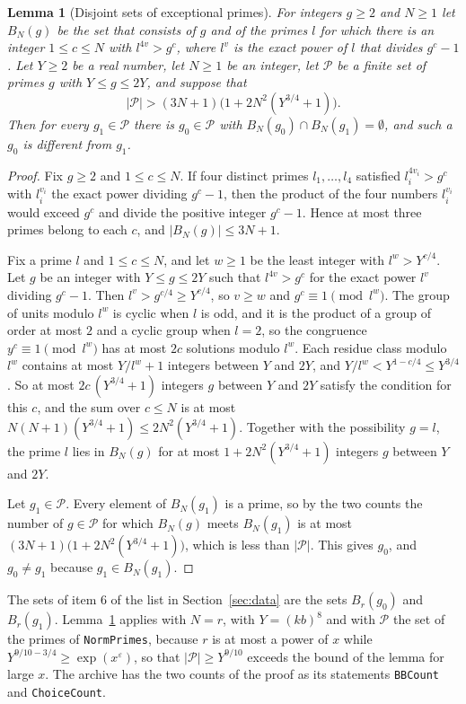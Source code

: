 \documentclass[11pt,letterpaper]{article}
\newtheorem{lemma}[theorem]{Lemma}
\numberwithin{equation}{section}
\begin{document}
\begin{lemma}[Disjoint sets of exceptional primes]\label{disjoint}
For integers $g\ge2$ and $N\ge1$ let $B_N(g)$ be the set that consists of $g$ and of the primes $l$ for which there is an integer $1\le c\le N$ with $l^{4v}>g^{c}$, where $l^{v}$ is the exact power of $l$ that divides $g^{c}-1$. Let $Y\ge2$ be a real number, let $N\ge1$ be an integer, let $\mathcal P$ be a finite set of primes $g$ with $Y\le g\le2Y$, and suppose that
\[
|\mathcal P|>(3N+1)\big(1+2N^2(Y^{3/4}+1)\big).
\]
Then for every $g_1\in\mathcal P$ there is $g_0\in\mathcal P$ with $B_N(g_0)\cap B_N(g_1)=\emptyset$, and such a $g_0$ is different from $g_1$.
\end{lemma}
\begin{proof}
Fix $g\ge2$ and $1\le c\le N$. If four distinct primes $l_1,\dots,l_4$ satisfied $l_i^{4v_i}>g^{c}$ with $l_i^{v_i}$ the exact power dividing $g^{c}-1$, then the product of the four numbers $l_i^{v_i}$ would exceed $g^{c}$ and divide the positive integer $g^{c}-1$. Hence at most three primes belong to each $c$, and $|B_N(g)|\le3N+1$.

Fix a prime $l$ and $1\le c\le N$, and let $w\ge1$ be the least integer with $l^{w}>Y^{c/4}$. Let $g$ be an integer with $Y\le g\le2Y$ such that $l^{4v}>g^{c}$ for the exact power $l^{v}$ dividing $g^{c}-1$. Then $l^{v}>g^{c/4}\ge Y^{c/4}$, so $v\ge w$ and $g^{c}\equiv1\pmod{l^{w}}$. The group of units modulo $l^{w}$ is cyclic when $l$ is odd, and it is the product of a group of order at most $2$ and a cyclic group when $l=2$, so the congruence $y^{c}\equiv1\pmod{l^{w}}$ has at most $2c$ solutions modulo $l^{w}$. Each residue class modulo $l^{w}$ contains at most $Y/l^{w}+1$ integers between $Y$ and $2Y$, and $Y/l^{w}<Y^{1-c/4}\le Y^{3/4}$. So at most $2c\,(Y^{3/4}+1)$ integers $g$ between $Y$ and $2Y$ satisfy the condition for this $c$, and the sum over $c\le N$ is at most $N(N+1)(Y^{3/4}+1)\le2N^2(Y^{3/4}+1)$. Together with the possibility $g=l$, the prime $l$ lies in $B_N(g)$ for at most $1+2N^2(Y^{3/4}+1)$ integers $g$ between $Y$ and $2Y$.

Let $g_1\in\mathcal P$. Every element of $B_N(g_1)$ is a prime, so by the two counts the number of $g\in\mathcal P$ for which $B_N(g)$ meets $B_N(g_1)$ is at most $(3N+1)\big(1+2N^2(Y^{3/4}+1)\big)$, which is less than $|\mathcal P|$. This gives $g_0$, and $g_0\ne g_1$ because $g_1\in B_N(g_1)$.
\end{proof}

The sets of item 6 of the list in Section~\ref{sec:data} are the sets $B_r(g_0)$ and $B_r(g_1)$. Lemma~\ref{disjoint} applies with $N=r$, with $Y=(kb)^8$ and with $\mathcal P$ the set of the primes of \texttt{NormPrimes}, because $r$ is at most a power of $x$ while $Y^{9/10-3/4}\ge\exp(x^{\varepsilon})$, so that $|\mathcal P|\ge Y^{9/10}$ exceeds the bound of the lemma for large $x$. The archive has the two counts of the proof as its statements \texttt{BBCount} and \texttt{ChoiceCount}.
\end{document}
